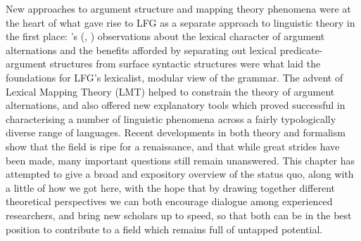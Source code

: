 \documentclass[output=paper]{langscibook}
\begin{document}
New approaches to argument structure and mapping theory phenomena were at the
heart of what gave rise to LFG as a separate approach to linguistic theory in
the first place: \citeauthor{bresnan:polyadicity}'s
(\citeyear{bresnan:polyadicity}, \citeyear{bresnan1982the-passive}) observations
about the lexical character of argument alternations and the benefits afforded
by separating out lexical predicate-argument structures from surface syntactic
structures were what laid the foundations for LFG's lexicalist, modular view of
the grammar. The advent of Lexical Mapping Theory (LMT) helped to constrain the
theory of argument alternations, and also offered new explanatory tools which
proved successful in characterising a number of linguistic phenomena across a
fairly typologically diverse range of languages. Recent developments in both
theory and formalism show that the field is ripe for a renaissance, and that
while great strides have been made, many important questions still remain
unanswered. This chapter has attempted to give a broad and expository overview
of the status quo, along with a little of how we got here, with the hope that by
drawing together different theoretical perspectives we can both encourage
dialogue among experienced researchers, and bring new scholars up to speed, so
that both can be in the best position to contribute to a field which remains
full of untapped potential.


\end{document}

